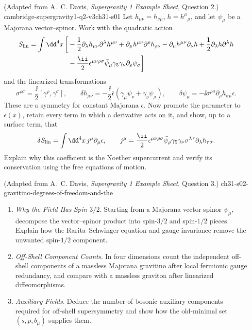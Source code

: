 
\begin{enumerate}
    {(Adapted from A.~C. Davis, \emph{Supergravity 1 Example Sheet},
      Question 2.)}
    {cambridge-supergravity1-q2-v3ch31-s01}
  Let \(h_{\mu\nu}=h_{\nu\mu}\), \(h=h^\mu{}_{\mu}\), and let
  \(\psi_\mu\) be a Majorana vector--spinor.  Work with the quadratic
  action
  \[
  \begin{split}
    S_{\rm lin}=\int \dd^4x\,\bigg[&
      -\frac12\partial_\lambda h_{\mu\nu}\partial^\lambda h^{\mu\nu}
      +\partial_\mu h^{\mu\nu}\partial^\rho h_{\rho\nu}
      -\partial_\mu h^{\mu\nu}\partial_\nu h
      +\frac12\partial_\lambda h\partial^\lambda h\\
      &-\frac{\ii}{2}\epsilon^{\mu\nu\rho\sigma}
        \bar\psi_\mu\gamma_5\gamma_\nu\partial_\rho\psi_\sigma
      \bigg]
  \end{split}
  \]
  and the linearized transformations
  \[
    \sigma^{\rho\sigma}=\frac{\ii}{2}[\gamma^\rho,\gamma^\sigma],
    \qquad
    \delta h_{\mu\nu}=-\frac{\ii}{2}\bar\epsilon
      (\gamma_\mu\psi_\nu+\gamma_\nu\psi_\mu),
    \qquad
    \delta\psi_\mu=-\ii\sigma^{\rho\sigma}
      \partial_\rho h_{\sigma\mu}\epsilon .
  \]
  These are a symmetry for constant Majorana \(\epsilon\).  Now promote
  the parameter to \(\epsilon(x)\), retain every term in which a derivative
  acts on it, and show, up to a surface term, that
  \[
    \delta S_{\rm lin}=\int \dd^4x\,j^\mu\partial_\mu\epsilon,
    \qquad
    j^\mu=\frac{\ii}{2}\epsilon^{\mu\nu\rho\sigma}
      \bar\psi_\rho\gamma_5\gamma_\nu\sigma^{\lambda\tau}
      \partial_\lambda h_{\tau\sigma}.
  \]
  Explain why this coefficient is the Noether supercurrent and verify its
  conservation using the free equations of motion.

    {(Adapted from A.~C. Davis, \emph{Supergravity 1 Example Sheet}, Question 3.)}
    {ch31-s02-gravitino-degrees-of-freedom-and-the}
  \begin{enumerate}
    \item \emph{Why the Field Has Spin \(3/2\).}
    Starting from a Majorana vector-spinor \(\psi_\mu\), decompose the
      vector--spinor product into spin-\(3/2\) and spin-\(1/2\) pieces.
      Explain how the Rarita--Schwinger equation and gauge invariance remove
      the unwanted spin-\(1/2\) component.
    \item \emph{Off-Shell Component Counts.}
    In four dimensions count the independent off-shell components of a
      massless Majorana gravitino after local fermionic gauge redundancy, and
      compare with a massless graviton after linearized diffeomorphisms.
    \item \emph{Auxiliary Fields.}
    Deduce the number of bosonic auxiliary components required for off-shell
      supersymmetry and show how the old-minimal set
      \((s,p,b_\mu)\) supplies them.
  \end{enumerate}


\end{enumerate}

